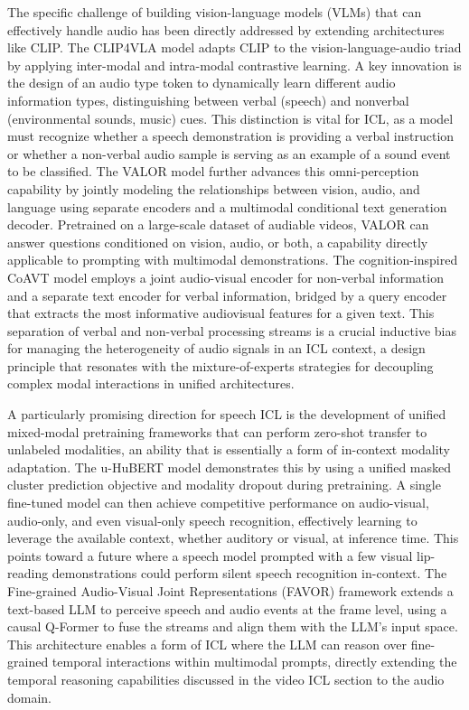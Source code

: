 \documentclass[11pt]{article}
\begin{document}
The specific challenge of building vision-language models (VLMs) that can effectively handle audio has been directly addressed by extending architectures like CLIP. The CLIP4VLA model \cite{ref286} adapts CLIP to the vision-language-audio triad by applying inter-modal and intra-modal contrastive learning. A key innovation is the design of an audio type token to dynamically learn different audio information types, distinguishing between verbal (speech) and nonverbal (environmental sounds, music) cues. This distinction is vital for ICL, as a model must recognize whether a speech demonstration is providing a verbal instruction or whether a non-verbal audio sample is serving as an example of a sound event to be classified. The VALOR model \cite{ref287} further advances this omni-perception capability by jointly modeling the relationships between vision, audio, and language using separate encoders and a multimodal conditional text generation decoder. Pretrained on a large-scale dataset of audiable videos, VALOR can answer questions conditioned on vision, audio, or both, a capability directly applicable to prompting with multimodal demonstrations. The cognition-inspired CoAVT model \cite{ref288} employs a joint audio-visual encoder for non-verbal information and a separate text encoder for verbal information, bridged by a query encoder that extracts the most informative audiovisual features for a given text. This separation of verbal and non-verbal processing streams is a crucial inductive bias for managing the heterogeneity of audio signals in an ICL context, a design principle that resonates with the mixture-of-experts strategies for decoupling complex modal interactions in unified architectures.

A particularly promising direction for speech ICL is the development of unified mixed-modal pretraining frameworks that can perform zero-shot transfer to unlabeled modalities, an ability that is essentially a form of in-context modality adaptation. The u-HuBERT model \cite{ref289} demonstrates this by using a unified masked cluster prediction objective and modality dropout during pretraining. A single fine-tuned model can then achieve competitive performance on audio-visual, audio-only, and even visual-only speech recognition, effectively learning to leverage the available context, whether auditory or visual, at inference time. This points toward a future where a speech model prompted with a few visual lip-reading demonstrations could perform silent speech recognition in-context. The Fine-grained Audio-Visual Joint Representations (FAVOR) framework \cite{ref290} extends a text-based LLM to perceive speech and audio events at the frame level, using a causal Q-Former to fuse the streams and align them with the LLM's input space. This architecture enables a form of ICL where the LLM can reason over fine-grained temporal interactions within multimodal prompts, directly extending the temporal reasoning capabilities discussed in the video ICL section to the audio domain.
\end{document}
